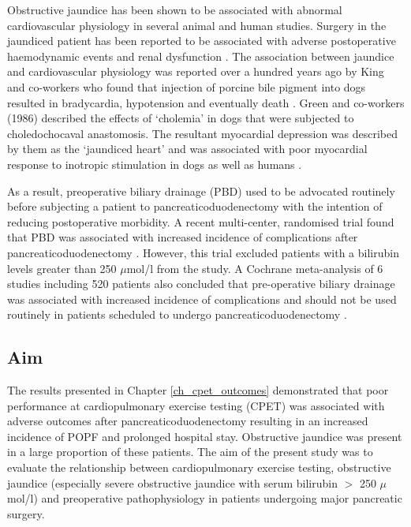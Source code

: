 Obstructive jaundice has been shown to be associated with abnormal cardiovascular physiology in several animal and human studies. 
Surgery in the jaundiced patient has been reported to be associated with adverse postoperative haemodynamic events and renal dysfunction \parencite{pain_perioperative_1985,green_systemic_1995}. 
The association between jaundice and cardiovascular physiology was reported over a hundred years ago by King and co-workers who found that injection of porcine bile pigment into dogs resulted in bradycardia, hypotension and eventually death \parencite{king_effect_1909}. 
Green and co-workers (1986) described the effects of `cholemia' in dogs that were subjected to choledochocaval anastomosis. 
The resultant myocardial depression was described by them as the `jaundiced heart' \parencite{green_jaundiced_1986} and was associated with poor myocardial response to inotropic stimulation in dogs \parencite{binah_obstructive_1985, bomzon_systemic_1986} as well as humans \parencite{lumlertgul_jaundiced_1991}.

As a result, preoperative biliary drainage (PBD) used to be advocated routinely before subjecting a patient to pancreaticoduodenectomy with the intention of reducing postoperative morbidity. 
A recent multi-center, randomised trial found that PBD was associated with increased incidence of complications after pancreaticoduodenectomy \parencite{van_der_gaag_preoperative_2010}.
However, this trial excluded patients with a bilirubin levels greater than 250 $\mu$mol/l from the study. 
A Cochrane meta-analysis of 6 studies including 520 patients also concluded that pre-operative biliary drainage was associated with increased incidence of complications and should not be used routinely in patients scheduled to undergo pancreaticoduodenectomy \parencite{fang_pre-operative_2012}.

\subsection{Aim}
The results presented in Chapter \ref{ch_cpet_outcomes} demonstrated that poor performance at cardiopulmonary exercise testing (CPET) was associated with adverse outcomes after pancreaticoduodenectomy resulting in an increased incidence of POPF and prolonged hospital stay. 
Obstructive jaundice was present in a large proportion of these patients.
The aim of the present study was to evaluate the relationship between cardiopulmonary exercise testing, obstructive jaundice (especially severe obstructive jaundice with serum bilirubin $>$ 250 $\mu$mol/l) and preoperative pathophysiology in patients undergoing major pancreatic surgery.

